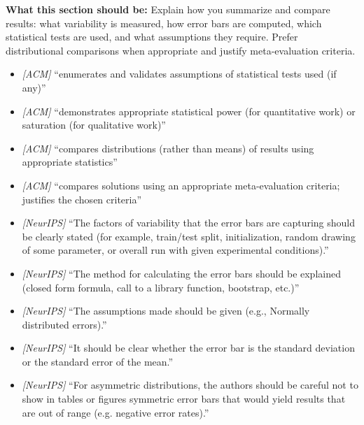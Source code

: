 \noindent\textbf{What this section should be:}
Explain how you summarize and compare results: what variability is measured, how error bars are computed, which statistical tests are used, and what assumptions they require. Prefer distributional comparisons when appropriate and justify meta-evaluation criteria.
\begin{itemize}
  \item \textit{[ACM]} ``enumerates and validates assumptions of statistical tests used (if any)''
  \item \textit{[ACM]} ``demonstrates appropriate statistical power (for quantitative work) or saturation (for qualitative work)''
  \item \textit{[ACM]} ``compares distributions (rather than means) of results using appropriate statistics''
  \item \textit{[ACM]} ``compares solutions using an appropriate meta-evaluation criteria; justifies the chosen criteria''
  \item \textit{[NeurIPS]} ``The factors of variability that the error bars are capturing should be clearly stated (for example, train/test split, initialization, random drawing of some parameter, or overall run with given experimental conditions).''
  \item \textit{[NeurIPS]} ``The method for calculating the error bars should be explained (closed form formula, call to a library function, bootstrap, etc.)''
  \item \textit{[NeurIPS]} ``The assumptions made should be given (e.g., Normally distributed errors).''
  \item \textit{[NeurIPS]} ``It should be clear whether the error bar is the standard deviation or the standard error of the mean.''
  \item \textit{[NeurIPS]} ``For asymmetric distributions, the authors should be careful not to show in tables or figures symmetric error bars that would yield results that are out of range (e.g. negative error rates).''
\end{itemize}